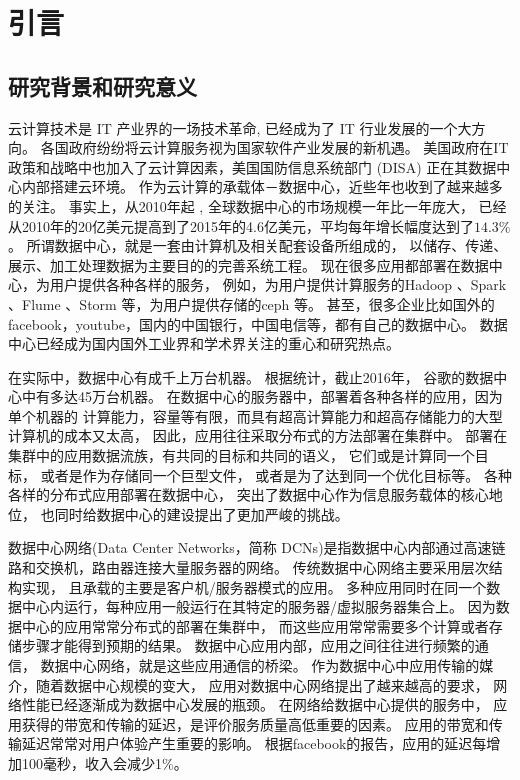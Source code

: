 \chapter{引言}
\label{cha:intro}

\section{研究背景和研究意义}

云计算技术是 IT 产业界的一场技术革命, 已经成为了 IT 行业发展的一个大方向。 
各国政府纷纷将云计算服务视为国家软件产业发展的新机遇。 
美国政府在IT政策和战略中也加入了云计算因素，美国国防信息系统部门 (DISA) 正在其数据中心内部搭建云环境\cite{fang-cloud}。
作为云计算的承载体－数据中心，近些年也收到了越来越多的关注。
事实上，从2010年起 , 全球数据中心的市场规模一年比一年庞大，
已经从2010年的20亿美元提高到了2015年的4.6亿美元，平均每年增长幅度达到了$14.3\%$\cite{wu-datacenter}。
所谓数据中心，就是一套由计算机及相关配套设备所组成的，
以储存、传递、展示、加工处理数据为主要目的的完善系统工程\cite{wu-datacenter}。
现在很多应用都部署在数据中心，为用户提供各种各样的服务，
例如，为用户提供计算服务的Hadoop \footnotemark[1]、Spark \footnotemark[2]、Flume \footnotemark[3]、Storm \footnotemark[4]等，为用户提供存储的ceph \footnotemark[5]等。
甚至，很多企业比如国外的facebook，youtube，国内的中国银行，中国电信等，都有自己的数据中心。
数据中心已经成为国内国外工业界和学术界关注的重心和研究热点。

在实际中，数据中心有成千上万台机器。
根据统计，截止2016年，
谷歌的数据中心中有多达45万台机器\cite{wei-dc}。
在数据中心的服务器中，部署着各种各样的应用，因为单个机器的
计算能力，容量等有限，而具有超高计算能力和超高存储能力的大型计算机的成本又太高，
因此，应用往往采取分布式的方法部署在集群中。
部署在集群中的应用数据流族，有共同的目标和共同的语义，
它们或是计算同一个目标，
或者是作为存储同一个巨型文件，
或者是为了达到同一个优化目标等。
各种各样的分布式应用部署在数据中心，
突出了数据中心作为信息服务载体的核心地位，
也同时给数据中心的建设提出了更加严峻的挑战。


数据中心网络(Data Center Networks，简称 DCNs)是指数据中心内部通过高速链路和交换机，路由器连接大量服务器的网络。
传统数据中心网络主要采用层次结构实现，
且承载的主要是客户机/服务器模式的应用。
多种应用同时在同一个数据中心内运行，每种应用一般运行在其特定的服务器/虚拟服务器集合上\cite{wei-dc}。
因为数据中心的应用常常分布式的部署在集群中，
而这些应用常常需要多个计算或者存储步骤才能得到预期的结果。
数据中心应用内部，应用之间往往进行频繁的通信，
数据中心网络，就是这些应用通信的桥梁。
作为数据中心中应用传输的媒介，随着数据中心规模的变大，
应用对数据中心网络提出了越来越高的要求，
网络性能已经逐渐成为数据中心发展的瓶颈。
在网络给数据中心提供的服务中，
应用获得的带宽和传输的延迟，是评价服务质量高低重要的因素。
应用的带宽和传输延迟常常对用户体验产生重要的影响。
根据facebook的报告\cite{Latency}，应用的延迟每增加100毫秒，收入会减少1$\%$。


